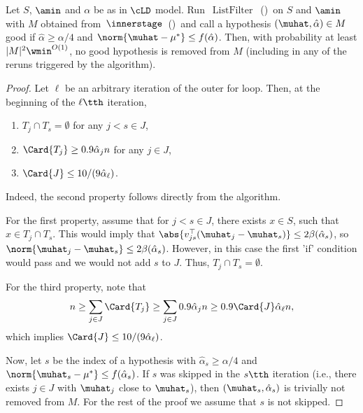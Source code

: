 \begin{lemma}
    \label{lemma:not_remove_good}
    Let \(S\), \(\amin\) and \(\alpha\) be as in \(\cLD\) model. Run~\(\operatorname{ListFilter}\)~()~on \(S\) and \(\amin\) with \(M\) obtained from~\(\innerstage\)~()~and call a hypothesis $(\muhat, \hat\alpha) \in M$ good if $\hat\alpha \geq \alpha/4$ and $\norm{\muhat - \mu^*} \leq f(\hat\alpha)$.
    Then, with probability at least $|M|^2 \wmin^{O(1)}$, no good hypothesis is removed from $M$ (including in any of the reruns triggered by the algorithm).
\end{lemma}

\begin{proof}
Let \(\ell\) be an arbitrary iteration of the outer for loop. Then, at the beginning of the \(\ell\tth\) iteration, 
\begin{enumerate}
    \item \(T_j \cap T_s = \emptyset\) for any \(j < s \in J\),
    \item \(\Card{T_j} \geq 0.9\hat\alpha_j n\) for any \(j \in J\),
    \item \(\Card{J} \leq 10 / (9\hat\alpha_\ell)\).
\end{enumerate}
Indeed, the second property follows directly from the algorithm. 

For the first property, assume that for \(j < s \in J\), there exists \(x \in S\), such that \(x \in T_j \cap T_s\).
This would imply that \(\abs{v_{js}^{\top}(\muhat_j - \muhat_s)} \leq 2\beta(\hat\alpha_s)\), so
\(\norm{\muhat_j - \muhat_s} \leq 2\beta(\hat\alpha_s)\). 
However, in this case the first 'if' condition would pass and we would not add \(s\) to \(J\).
Thus, \(T_j \cap T_s = \emptyset\).

For the third property, note that
\begin{equation*}
    n \geq \sum_{j \in J} \Card{T_j} \geq \sum_{j \in J} 0.9\hat\alpha_j n \geq 0.9\Card{J} \hat\alpha_\ell n,
\end{equation*}
which implies \(\Card{J} \leq 10 / (9\hat\alpha_\ell)\). 

Now, let \(s\) be the index of a hypothesis with \(\hat\alpha_s \geq \alpha/4\) and
\(\norm{\muhat_s - \mu^{\ast}} \leq f(\hat \alpha_s)\).
If \(s\) was skipped in the \(s\tth\) iteration (i.e., there exists \(j \in J\) with $\muhat_j$ close to \(\muhat_s\)), then \((\muhat_s, \hat\alpha_s)\) is trivially not removed from \(M\).
For the rest of the proof we assume that \(s\) is not skipped.


\end{proof}
